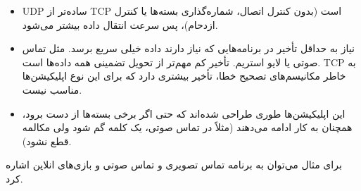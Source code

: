 \begin{itemize}
    \item  UDP ساده‌تر از TCP است (بدون کنترل اتصال، شماره‌گذاری بسته‌ها یا کنترل ازدحام)، پس سرعت انتقال داده بیشتر می‌شود.
    \item نیاز به حداقل تأخیر در برنامه‌هایی که نیاز دارند داده خیلی سریع برسد. مثل تماس صوتی یا لایو استریم.
    تأخیر کم مهم‌تر از تحویل تضمینی همه داده‌ها است. TCP به خاطر مکانیسم‌های تصحیح خطا، تأخیر بیشتری دارد که برای این نوع اپلیکیشن‌ها مناسب نیست.
    \item این اپلیکیشن‌ها طوری طراحی شده‌اند که حتی اگر برخی بسته‌ها از دست برود، همچنان به کار ادامه می‌دهند (مثلاً در تماس صوتی، یک کلمه گم شود ولی مکالمه قطع نشود).
\end{itemize}

برای مثال می‌توان به برنامه تماس تصویری و تماس صوتی و بازی‌های انلاین اشاره کرد.